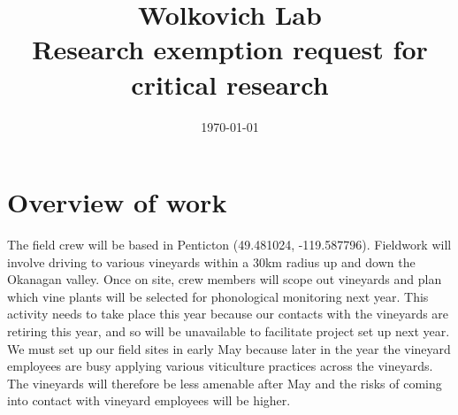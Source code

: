\documentclass[11pt,letter]{article}
\begin{document}

\renewcommand{\refname}{\CHead{}}

\title{Wolkovich Lab \\ Research exemption request for critical research}
\date{\today}
\maketitle
\tableofcontents


\section{Overview of work}
The field crew will be based in Penticton (49.481024, -119.587796). Fieldwork will involve driving to various vineyards within a 30km radius up and down the Okanagan valley. Once on site, crew members will scope out vineyards and plan which vine plants will be selected for phonological monitoring next year. This activity needs to take place this year because our contacts with the vineyards are retiring this year, and so will be unavailable to facilitate project set up next year. We must set up our field sites in early May because later in the year the vineyard employees are busy applying various viticulture practices across the vineyards. The vineyards will therefore be less amenable after May and the risks of coming into contact with vineyard employees will be higher.\\
\end{document}
